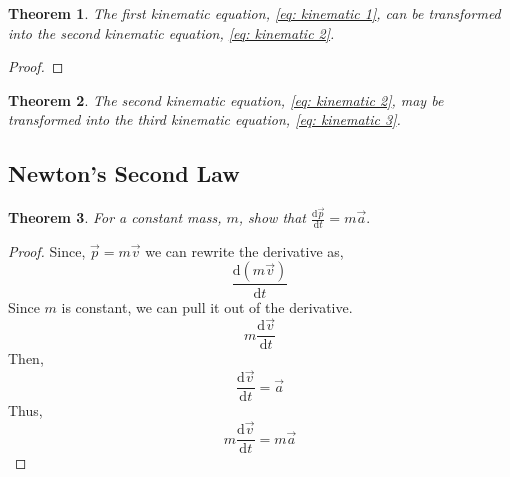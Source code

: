 \documentclass{article}
\newtheorem{theorem}{Theorem}[section]
\begin{document}
\begin{theorem}
    The first kinematic equation, \ref{eq: kinematic 1}, can be transformed into the second kinematic equation, \ref{eq: kinematic 2}.
\end{theorem}
\begin{proof}
      
\end{proof}

\begin{theorem}
    The second kinematic equation, \ref{eq: kinematic 2}, may be transformed into the third kinematic equation, \ref{eq: kinematic 3}.
\end{theorem}

\subsection{Newton's Second Law}
\begin{theorem}
For a constant mass, $m$, show that $\frac{\mathrm{d}\vec{p}}{\mathrm{d}t} = m\vec{a}.$
\end{theorem}
\begin{proof}
    Since, $\vec{p} = m \vec{v}$ we can rewrite the derivative as,
    \[ \frac{\mathrm{d}(m \vec{v})}{\mathrm{d}t} \]
    Since $m$ is constant, we can pull it out of the derivative.
    \[ m\frac{\mathrm{d}\vec{v}}{\mathrm{d}t} \]
    Then,
    \[\frac{\mathrm{d}\vec{v}}{\mathrm{d}t} = \vec{a}\]
    Thus, \[ m\frac{\mathrm{d}\vec{v}}{\mathrm{d}t} = m\vec{a}\]
\end{proof}
\end{document}
